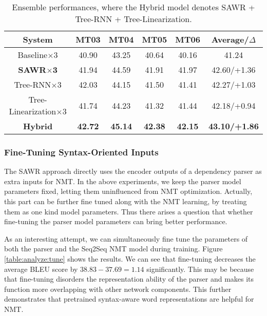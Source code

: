 \documentclass[11pt,a4paper]{article}
\begin{document}
\begin{CJK}{UTF8}{gbsn}
\setlength{\tabcolsep}{6pt}
\begin{table*}[ht]
\begin{center}
\begin{tabular}{c|cccc|c}
\hline
System & MT03  & MT04  & MT05  & MT06 & Average/$\Delta$ \\ \hline
Baseline$\times$3  &     40.90   &  43.25     &  40.64     &   40.16  & 41.24      \\ \hline
\textbf{SAWR}$\bm{\times}$\textbf{3} &     41.94    &   44.59    &   41.91    &    41.97  &    42.60/+1.36   \\
Tree-RNN$\times$3 &    42.03    &   44.15    &   41.50    &   41.41   &  42.27/+1.03      \\
Tree-Linearization$\times$3 &     41.74    &   44.23    &   41.32    &   41.44   &  42.18/+0.94    \\ \hline
\textbf{Hybrid} &    \bf 42.72   &    \bf 45.14   &    \bf 42.38   &   \bf 42.15   &  \bf43.10/+1.86     \\ \hline
\end{tabular}
\caption{Ensemble performances, where the Hybrid model denotes SAWR + Tree-RNN + Tree-Linearization. } \label{table:chinese:ensemble:result}
\end{center}
\end{table*}




\subsubsection{Fine-Tuning Syntax-Oriented Inputs}
The SAWR approach directly uses the encoder outputs of a dependency parser as extra inputs for NMT.
In the above experiments, we keep the parser model parameters fixed, letting them uninfluenced from NMT optimization.
Actually, this part can be further fine tuned along with the NMT learning,
by treating them as one kind model parameters.
Thus there arises a question that whether fine-tuning the parser model parameters can bring better performance.

As an interesting attempt, we can simultaneously
fine tune the parameters of both the parser and the Seq2Seq NMT model during training.
Figure \ref{table:analyze:tune} shows the results.
We can see that fine-tuning decreases the average BLEU score by $38.83-37.69=1.14$ significantly.
This may be because that fine-tuning disorders the representation ability of
the parser and makes its function more overlapping with other network components.
This further demonstrates that pretrained syntax-aware word representations are helpful for NMT.



\end{CJK}
\end{document}
